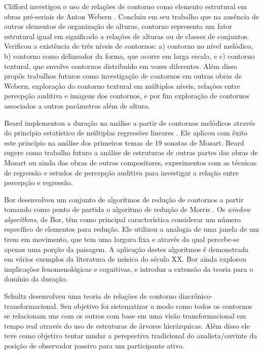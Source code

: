 \documentclass[12pt]{article}
\newcommand{\eng}[1]{\textit{#1}}
\begin{document}
Clifford investigou o uso de relações de contorno como elemento
estrutural em obras pré-seriais de Anton Webern
\cite{clifford95:contour}. Concluiu em seu trabalho que na ausência de
outros elementos de organização de alturas, contorno representa um
fator estrutural igual em significado a relações de alturas ou de
classes de conjuntos. Verificou a existência de três níveis de
contornos: a) contorno no nível melódico, b) contorno como delineador
da forma, que ocorre em larga escala, e c) contorno textural, que
envolve contornos distribuído em vozes diferentes. Além disso propôs
trabalhos futuros como investigação de contornos em outras obras de
Webern, exploração do contorno textural em múltiplos níveis, relações
entre percepção auditiva e imagens dos contornos, e por fim exploração
de contornos associados a outros parâmetros além de altura.


Beard implementou a duração na análise a partir de contornos melódicos
através do princípio estatístico de múltiplas regressões lineares
\cite{beard03:contour}. Ele aplicou com êxito este princípio na
análise dos primeiros temas de 19 sonatas de Mozart. Beard sugere como
trabalho futuro a análise de estruturas de outras partes das obras de
Mozart ou ainda das obras de outros compositores, experimentos com as
técnicas de regressão e estudos de percepção auditiva para investigar
a relação entre percepção e regressão.


Bor \cite{bor09:contour} desenvolveu um conjunto de algoritmos de
redução de contornos a partir tomando como ponto de partida o
algoritmo de redução de Morris \cite{morris93:directions}. Os
\eng{window algorithms}, de Bor, têm como principal característica
considerar um número específico de elementos para redução. Ele
utilizou a analogia de uma janela de um trem em movimento, que tem uma
largura fixa e através da qual percebe-se apenas uma porção da
paisagem. A aplicação destes algoritmos é demonstrada em vários
exemplos da literatura de música do século XX. Bor ainda explorou
implicações fenomenológicas e cognitivas, e introduz a extensão da
teoria para o domínio da duração.


Schultz \cite{schultz09:diachronic} desenvolveu uma teoria de relações
de contorno diacrônico-transformacional. Seu objetivo foi sistematizar
o modo como todos os contornos se relacionam uns com os outros com
base em uma visão transformacional em tempo real através do uso de
estruturas de árvores hierárquicas. Além disso ele teve como objetivo
tentar mudar a perspectiva tradicional do analista/ouvinte da posição
de observador passivo para um participante ativo.
\end{document}
